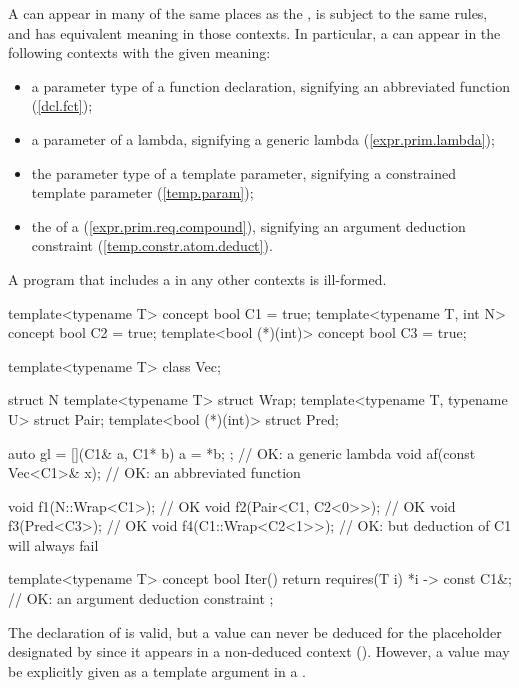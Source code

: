 \pnum
A 
can appear in many of the same places as the 
, is subject
to the same rules, and has equivalent meaning in those contexts. 
In particular, a  
can appear in the following contexts with the given meaning:
\begin{itemize}
\item a parameter type of a function declaration, signifying an 
     abbreviated function (\ref{dcl.fct});
\item a parameter of a lambda, signifying a generic lambda 
     (\ref{expr.prim.lambda});
\item the parameter type of a template parameter, signifying a
     constrained template parameter (\ref{temp.param});
\item the  of
     a 
     (\ref{expr.prim.req.compound}),
     signifying an argument deduction constraint 
     (\ref{temp.constr.atom.deduct}). 
\end{itemize}
A program that includes a 
in any other contexts is ill-formed.
% 
\enterexample
\begin{codeblock}
template<typename T> concept bool C1 = true;
template<typename T, int N> concept bool C2 = true;
template<bool (*)(int)> concept bool C3 = true;

template<typename T> class Vec;

struct N {
  template<typename T> struct Wrap;
}
template<typename T, typename U> struct Pair;
template<bool (*)(int)> struct Pred;

auto gl = [](C1& a, C1* b) { a = *b; }; // OK: a generic lambda
void af(const Vec<C1>& x);              // OK: an abbreviated function

void f1(N::Wrap<C1>);     // OK
void f2(Pair<C1, C2<0>>); // OK
void f3(Pred<C3>);        // OK
void f4(C1::Wrap<C2<1>>); // OK: but deduction of C1 will always fail

template<typename T> concept bool Iter() {
  return requires(T i) {
    {*i} -> const C1&; // OK: an argument deduction constraint
  };
}
\end{codeblock}
The declaration of  is valid, but a value can never be deduced 
for the placeholder designated by  since it appears in a
non-deduced context ().
However, a value may be explicitly given as a template argument in a
.
\exitexample


